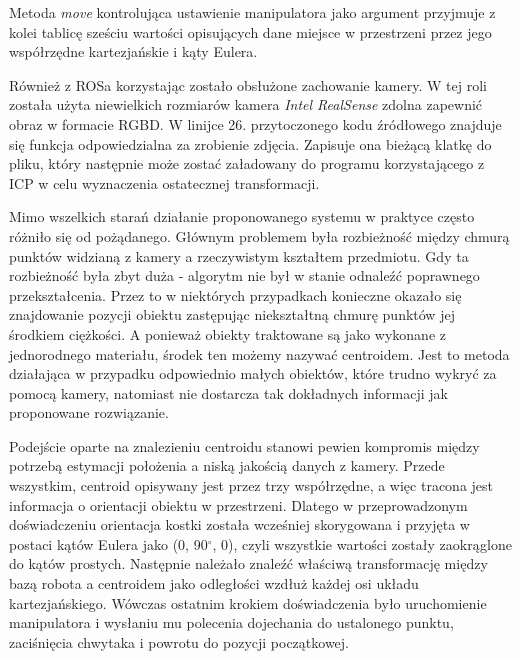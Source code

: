 \documentclass{article}
\begin{document}

\vspace{5mm}

Metoda \emph{move} kontrolująca ustawienie manipulatora jako argument przyjmuje z kolei tablicę sześciu wartości opisujących dane miejsce w przestrzeni przez jego współrzędne kartezjańskie i kąty Eulera.

\vspace{5mm}
 
\vspace{5mm}

Również z ROSa korzystając zostało obsłużone zachowanie kamery. W tej roli została użyta niewielkich rozmiarów kamera \emph{Intel RealSense} zdolna zapewnić obraz w formacie RGBD. W linijce 26. przytoczonego kodu źródłowego znajduje się funkcja odpowiedzialna za zrobienie zdjęcia. Zapisuje ona bieżącą klatkę do pliku, który następnie może zostać załadowany do programu korzystającego z ICP w celu wyznaczenia ostatecznej transformacji.

\vspace{5mm}

\vspace{5mm}

Mimo wszelkich starań działanie proponowanego systemu w praktyce często różniło się od pożądanego. Głównym problemem była rozbieżność między chmurą punktów widzianą z kamery a rzeczywistym kształtem przedmiotu. Gdy ta rozbieżność była zbyt duża - algorytm nie był w stanie odnaleźć poprawnego przekształcenia. Przez to w niektórych przypadkach konieczne okazało się znajdowanie pozycji obiektu zastępując niekształtną chmurę punktów jej środkiem ciężkości. A ponieważ obiekty traktowane są jako wykonane z jednorodnego materiału, środek ten możemy nazywać centroidem. Jest to metoda działająca w przypadku odpowiednio małych obiektów, które trudno wykryć za pomocą kamery, natomiast nie dostarcza tak dokładnych informacji jak proponowane rozwiązanie.

Podejście oparte na znalezieniu centroidu stanowi pewien kompromis między potrzebą estymacji położenia a niską jakością danych z kamery. Przede wszystkim, centroid opisywany jest przez trzy współrzędne, a więc tracona jest informacja o orientacji obiektu w przestrzeni. Dlatego w przeprowadzonym doświadczeniu orientacja kostki została wcześniej skorygowana i przyjęta w postaci kątów Eulera jako (0, 90$^\circ$, 0), czyli wszystkie wartości zostały zaokrąglone do kątów prostych. Następnie należało znaleźć właściwą transformację między bazą robota a centroidem jako odległości wzdłuż każdej osi układu kartezjańskiego. Wówczas ostatnim krokiem doświadczenia było uruchomienie manipulatora i wysłaniu mu polecenia dojechania do ustalonego punktu, zaciśnięcia chwytaka i powrotu do pozycji początkowej. 
\end{document}
